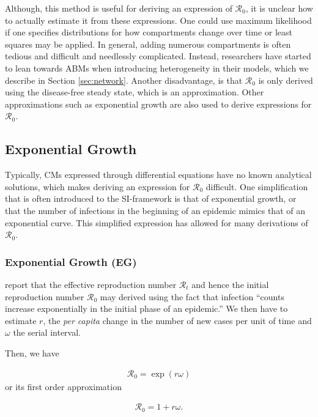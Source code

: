 \documentclass[12pt]{article}
\newcommand{\rr}{\ensuremath{\mathcal{R}_0}}
\begin{document}
Although, this method is useful for deriving an expression of $\rr$, it is unclear how to actually estimate it from these expressions.  One could use maximum likelihood if one specifies distributions for how compartments change over time or least squares may be applied. In general, adding numerous compartments is often tedious and difficult and needlessly complicated.  Instead, researchers have started to lean towards ABMs when introducing heterogeneity in their models, which we describe in Section \ref{sec:network}.  Another disadvantage, is that $\rr$ is only derived using the disease-free steady state, which is an approximation.  Other approximations such as exponential growth are also used to derive expressions for $\rr$.


\subsection{Exponential Growth}\label{sec:exp-growth}
Typically, CMs expressed through differential equations have no known analytical solutions, which makes deriving an expression for $\rr$ difficult.  One simplification that is often introduced to the SI-framework is that of exponential growth, or that the number of infections in the beginning of an epidemic mimics that of an exponential curve.  This simplified expression has allowed for many derivations of $\rr$.


\subsubsection{Exponential Growth (EG)}
\label{sec:expgrowth}
\cite{wallinga2007generation} report that the effective reproduction number $\mathcal{R}_t$ and hence the initial reproduction number $\rr$ may derived using the fact that infection ``counts increase exponentially in the initial phase of an epidemic.''  We then have to estimate $r$, the \textit{per capita} change in the number of new cases per unit of time and $\omega$ the serial interval.

Then, we have

\begin{align}\label{eq:lotka}
\rr = \exp{(r \omega)}
\end{align}
or its first order approximation

\begin{align}\label{eq:anderson}
\rr = 1 + r \omega.
\end{align}
\end{document}
